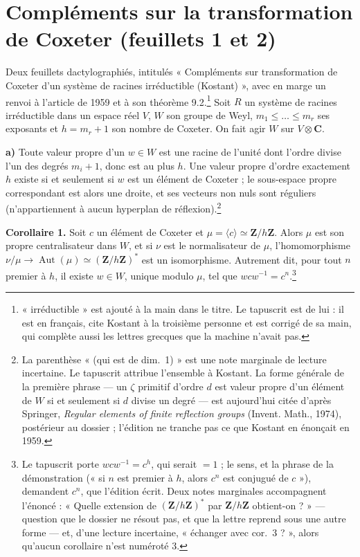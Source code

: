 \documentclass[11pt,a4paper]{article}
\begin{document}
\section*{Compléments sur la transformation de Coxeter (feuillets 1 et 2)}

Deux feuillets dactylographiés, intitulés « Compléments sur transformation de
Coxeter d'un système de racines irréductible (Kostant) », avec en marge un
renvoi à l'article de 1959 et à son théorème 9.2.\footnote{« irréductible »
est ajouté à la main dans le titre. Le tapuscrit est de lui : il est en
français, cite Kostant à la troisième personne et est corrigé de sa main, qui
complète aussi les lettres grecques que la machine n'avait pas.} Soit $R$ un
système de racines irréductible dans un espace réel $V$, $W$ son groupe de
Weyl, $m_{1}\leqslant\dots\leqslant m_{r}$ ses exposants et $h=m_{r}+1$ son
nombre de Coxeter. On fait agir $W$ sur $V\otimes\mathbf{C}$.

\textbf{a)} Toute valeur propre d'un $w\in W$ est une racine de l'unité dont
l'ordre divise l'un des degrés $m_{i}+1$, donc est au plus $h$. Une valeur
propre d'ordre exactement $h$ existe si et seulement si $w$ est un élément de
Coxeter ; le sous-espace propre correspondant est alors une droite, et ses
vecteurs non nuls sont réguliers (n'appartiennent à aucun hyperplan de
réflexion).\footnote{La parenthèse « (qui est de dim.\ 1) » est une note
marginale de lecture incertaine. Le tapuscrit attribue l'ensemble à Kostant.
La forme générale de la première phrase — un $\zeta$ primitif d'ordre $d$ est
valeur propre d'un élément de $W$ si et seulement si $d$ divise un degré — est
aujourd'hui citée d'après Springer, \emph{Regular elements of finite reflection
groups} (Invent. Math., 1974), postérieur au dossier ; l'édition ne tranche pas
ce que Kostant en énonçait en 1959.}

\textbf{Corollaire 1.} Soit $c$ un élément de Coxeter et $\mu=\langle
c\rangle\simeq\mathbf{Z}/h\mathbf{Z}$. Alors $\mu$ est son propre
centralisateur dans $W$, et si $\nu$ est le normalisateur de $\mu$,
l'homomorphisme $\nu/\mu\to\operatorname{Aut}(\mu)\simeq
(\mathbf{Z}/h\mathbf{Z})^{*}$ est un isomorphisme. Autrement dit, pour tout
$n$ premier à $h$, il existe $w\in W$, unique modulo $\mu$, tel que
$wcw^{-1}=c^{n}$.\footnote{Le tapuscrit porte $wcw^{-1}=c^{h}$, qui serait
$=1$ ; le sens, et la phrase de la démonstration (« si $n$ est premier à $h$,
alors $c^{n}$ est conjugué de $c$ »), demandent $c^{n}$, que l'édition écrit.
Deux notes marginales accompagnent l'énoncé : « Quelle extension de
$(\mathbf{Z}/h\mathbf{Z})^{*}$ par $\mathbf{Z}/h\mathbf{Z}$ obtient-on ? » —
question que le dossier ne résout pas, et que la lettre reprend sous une autre
forme — et, d'une lecture incertaine, « échanger avec cor.\ 3 ? », alors
qu'aucun corollaire n'est numéroté 3.}
\end{document}
